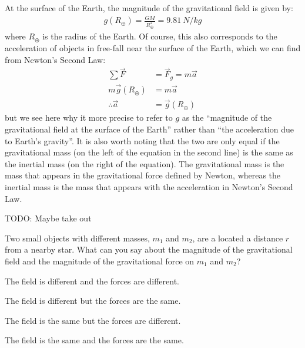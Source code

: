 At the surface of the Earth, the magnitude of the gravitational field is given by:
\begin{align*}
g(R_\oplus)=\frac{GM}{R_\oplus^2}=\SI{9.81}{N/kg}
\end{align*}
where $R_\oplus$ is the radius of the Earth. Of course, this also corresponds to the acceleration of objects in free-fall near the surface of the Earth, which we can find from Newton's Second Law:
\begin{align*}
\sum \vec F &= \vec F_g = m\vec a\\
m\vec g(R_\oplus)&= m\vec a\\
\therefore \vec a &= \vec g(R_\oplus)
\end{align*}
but we see here why it more precise to refer to $g$ as the ``magnitude of the gravitational field at the surface of the Earth'' rather than ``the acceleration due to Earth's gravity''. It is also worth noting that the two are only equal if the gravitational mass (on the left of the equation in the second line) is the same as the inertial mass (on the right of the equation). The gravitational mass is the mass that appears in the gravitational force defined by Newton, whereas the inertial mass is the mass that appears with the acceleration in Newton's Second Law.

TODO: Maybe take out
\begin{checkpoint}
\begin{MCquestion}{Two small objects with different masses, $m_1$ and $m_2$, are a located a distance $r$ from a nearby star. What can you say about the magnitude of the gravitational field and the magnitude of the gravitational force on $m_1$ and $m_2$?}
\item The field is different and the forces are different. 
\item The field is different but the forces are the same.
\item The field is the same but the forces are different.
\item The field is the same and the forces are the same. 
\end{MCquestion}
\end{checkpoint}

